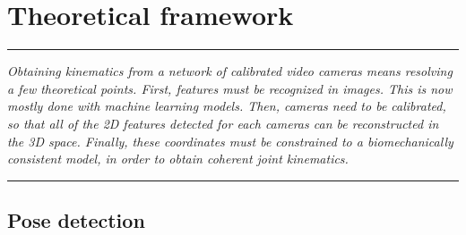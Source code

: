 
\lhead[\fancyplain{}{\leftmark}]%
      {\fancyplain{}{}} %
\chead[\fancyplain{}{}]%
      {\fancyplain{}{}}
\rhead[\fancyplain{}{}]%
      {\fancyplain{}{\rightmark}}%
\lfoot[\fancyplain{}{}]%
      {\fancyplain{}{}}
\cfoot[\fancyplain{}{\thepage}]%
      {\fancyplain{}{\thepage}} %
\rfoot[\fancyplain{}{}]%
     {\fancyplain{}{\scriptsize}}



\chapter{Theoretical framework}
\label{ch:2}


\begin{center}
\rule{0.7\linewidth}{.5pt}
\begin{minipage}{0.7\linewidth}
\smallskip

\textit{Obtaining kinematics from a network of calibrated video cameras means resolving a few theoretical points. First, features must be recognized in images. This is now mostly done with machine learning models. Then, cameras need to be calibrated, so that all of the 2D features detected for each cameras can be reconstructed in the 3D space. Finally, these coordinates must be constrained to a biomechanically consistent model, in order to obtain coherent joint kinematics.}

\end{minipage}
\smallskip
\rule{0.7\linewidth}{.5pt}
\end{center}

\minitoc
\newpage


\section{Pose detection}

